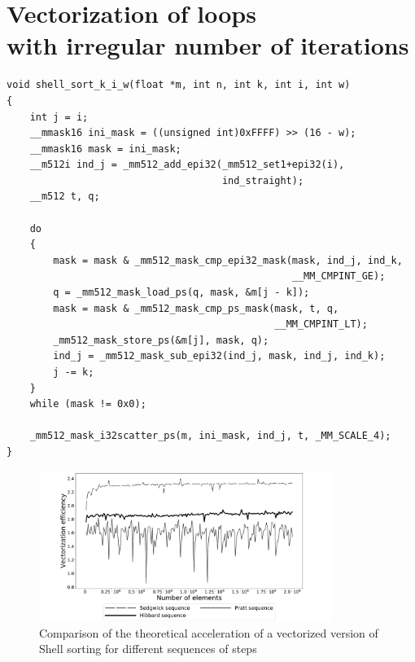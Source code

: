 \documentclass[
11pt,%
tightenlines,%
twoside,%
onecolumn,%
nofloats,%
nobibnotes,%
nofootinbib,%
superscriptaddress,%
noshowpacs,%
centertags]%
{revtex4}
\begin{document}
\section{Vectorization of loops \protect\\
with irregular number of iterations}

\begin{lstlisting}
void shell_sort_k_i_w(float *m, int n, int k, int i, int w)
{
    int j = i;
    __mmask16 ini_mask = ((unsigned int)0xFFFF) >> (16 - w);
    __mmask16 mask = ini_mask;
    __m512i ind_j = _mm512_add_epi32(_mm512_set1+epi32(i),
                                     ind_straight);
    __m512 t, q;

    do
    {
        mask = mask & _mm512_mask_cmp_epi32_mask(mask, ind_j, ind_k,
                                                 __MM_CMPINT_GE);
        q = _mm512_mask_load_ps(q, mask, &m[j - k]);
        mask = mask & _mm512_mask_cmp_ps_mask(mask, t, q,
                                              __MM_CMPINT_LT);
        _mm512_mask_store_ps(&m[j], mask, q);
        ind_j = _mm512_mask_sub_epi32(ind_j, mask, ind_j, ind_k);
        j -= k;
    }
    while (mask != 0x0);
    
    _mm512_mask_i32scatter_ps(m, ini_mask, ind_j, t, _MM_SCALE_4);
}
\end{lstlisting}

\begin{figure}[h]
\setcaptionmargin{5mm}
\onelinecaptionstrue  %
\includegraphics[width=0.85\textwidth]{pics/experimental_eff.pdf}
\caption{Comparison of the theoretical acceleration of a vectorized version of Shell sorting for different sequences of steps}\label{fig:1}
\end{figure}
\end{document}
